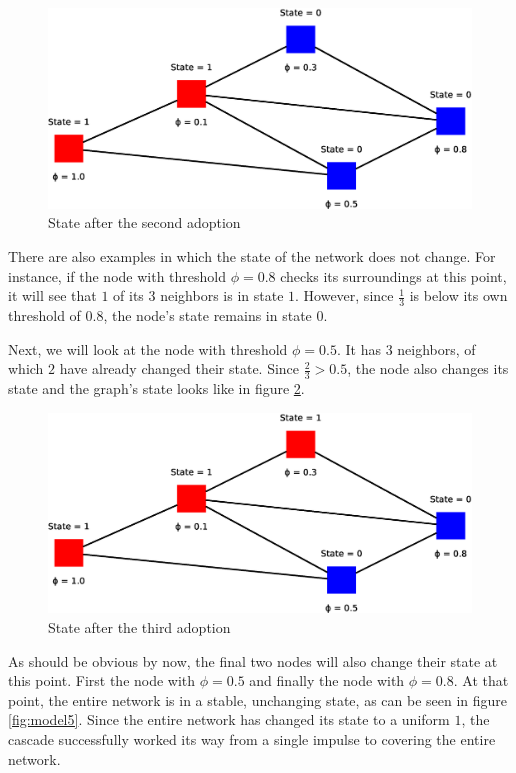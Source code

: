 \documentclass{sig-alternate-05-2015}
\begin{document}
\begin{figure}[h!]
    \includegraphics[width=\columnwidth]{../presentation/img/model6}
    \centering
    \caption{State after the second adoption}
    \label{fig:model3}
\end{figure}

There are also examples in which the state of the network does not change. For instance, if the node with threshold $\phi = 0.8$ checks its surroundings at this point, it will see that $1$ of its $3$ neighbors is in state $1$. However, since $\frac{1}{3}$ is below its own threshold of $0.8$, the node's state remains in state $0$.

Next, we will look at the node with threshold $\phi = 0.5$. It has $3$ neighbors, of which $2$ have already changed their state. Since $\frac{2}{3} > 0.5$, the node also changes its state and the graph's state looks like in figure \ref{fig:model4}.

\begin{figure}[h!]
    \includegraphics[width=\columnwidth]{../presentation/img/model7}
    \centering
    \caption{State after the third adoption}
    \label{fig:model4}
\end{figure}

As should be obvious by now, the final two nodes will also change their state at this point. First the node with $\phi = 0.5$ and finally the node with $\phi = 0.8$. At that point, the entire network is in a stable, unchanging state, as can be seen in figure \ref{fig:model5}. Since the entire network has changed its state to a uniform $1$, the cascade successfully worked its way from a single impulse to covering the entire network.
\end{document}
